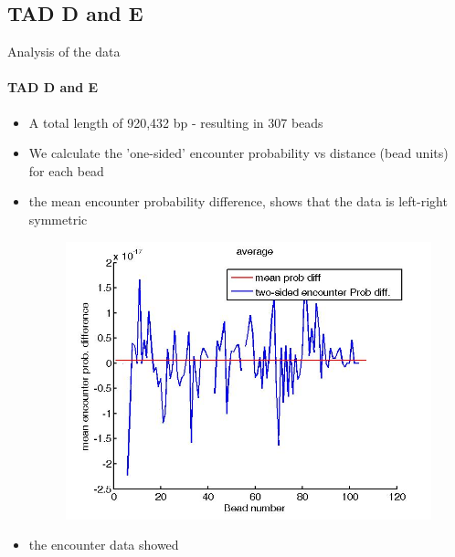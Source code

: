 \documentclass[8pt]{beamer}
\begin{document}
\subsection{TAD D and E}
\begin{frame}{Analysis of the data}
\framesubtitle{TAD D and E}
\begin{itemize}
\item A total length of 920,432 bp - resulting in 307 beads
\item We calculate the 'one-sided' encounter probability vs distance (bead units) for each bead
\item the mean encounter probability difference, shows that the data is left-right symmetric
\begin{figure}[H]
\includegraphics[scale=0.1]{symmetryOftheEncounterProbTADDAverage}
\end{figure}
\item the encounter data showed 
\end{itemize}


\end{frame}
\end{document}
